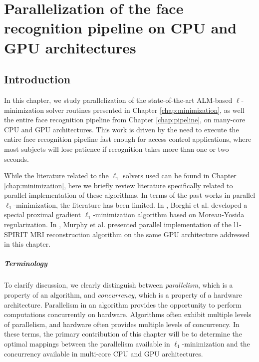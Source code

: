 \chapter{Parallelization of the face recognition
pipeline on CPU and GPU architectures}
\label{chap:parallel}

\section{Introduction} 
%
In this chapter, we study parallelization of the state-of-the-art ALM-based
$\ell$-minimization solver routines presented in Chapter
\ref{chap:minimization}, as well the entire face recognition pipeline from
Chapter \ref{chap:pipeline}, on many-core CPU and GPU architectures. 
This work is driven by the need to execute the entire face recognition
pipeline fast enough for access control applications, where most subjects
will lose patience if recognition takes more than one or two seconds.

While the literature related to the $\ell_1$ solvers
used can be found in Chapter \ref{chap:minimization}, here we
briefly review literature specifically related to parallel implementation of
these algorithms.  In terms of the past works in parallel
$\ell_1$-minimization, the literature has been limited. In \cite{BorghiA2010},
Borghi et al.  developed a special proximal gradient $\ell_1$-minimization
algorithm based on Moreau-Yosida regularization. In \cite{MurphyM2010}, Murphy
et al. presented parallel implementation of the l1-SPIRIT MRI reconstruction
algorithm on the same GPU architecture addressed in this chapter.

\paragraph{Terminology}
To clarify discussion, we clearly distinguish between {\em parallelism},
which is a property of an algorithm, and {\em concurrency}, which is a
property of a hardware architecture. Parallelism in an algorithm provides the
opportunity to perform computations concurrently on hardware.  Algorithms often
exhibit multiple levels of parallelism, and hardware often provides multiple
levels of concurrency.  In these terms, the primary contribution of this chapter
will be to determine the optimal mappings between the parallelism available in
$\ell_1$-minimization and the concurrency available in multi-core CPU and GPU
architectures.

